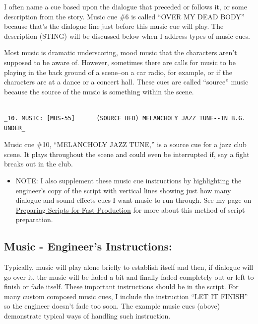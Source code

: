 \documentclass[openleft,oneside,showtrims]{memoir}
\begin{document}
\begin{itemize}
\begin{itemize}
I often name a cue based upon the dialogue that preceded or follows it, or some description from the story. Music cue \#6 is called ``OVER MY DEAD BODY'' because that's the dialogue line just before this music cue will play. The description (STING) will be discussed below when I address types of music cues.

Most music is dramatic underscoring, mood music that the characters aren't supposed to be aware of. However, sometimes there are calls for music to be playing in the back ground of a scene--on a car radio, for example, or if the characters are at a dance or a concert hall. These cues are called ``source'' music because the source of the music is something within the scene.

\lstset{language=fountain,label= ,caption= ,captionpos=b,numbers=none}
\begin{lstlisting}

_10. MUSIC: [MUS-55]      (SOURCE BED) MELANCHOLY JAZZ TUNE--IN B.G. UNDER_

\end{lstlisting}

Music cue \#10, ``MELANCHOLY JAZZ TUNE,'' is a source cue for a jazz club scene. It plays throughout the scene and could even be interrupted if, say a fight breaks out in the club.

\begin{itemize}
\item NOTE: I also supplement these music cue instructions by highlighting the engineer's copy of the script with vertical lines showing just how many dialogue and sound effects cues I want music to run through. See my page on \href{https://www.ruyasonic.com/prd\_pre-prod.htm}{Preparing Scripts for Fast Production} for more about this method of script preparation.
\end{itemize}
\end{itemize}
\end{itemize}

\subsection{Music - Engineer's Instructions:}
\label{sec:org31801b5}
Typically, music will play alone briefly to establish itself and then, if dialogue will go over it, the music will be faded a bit and finally faded completely out or left to finish or fade itself. These important instructions should be in the script. For many custom composed music cues, I include the instruction ``LET IT FINISH'' so the engineer doesn't fade too soon. The example music cues (above) demonstrate typical ways of handling such instruction.
\end{document}
